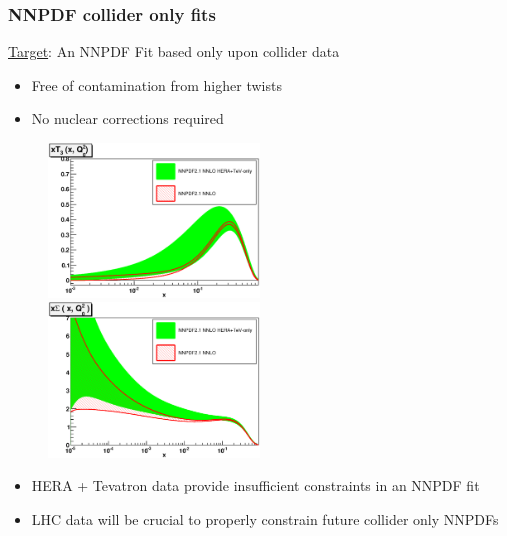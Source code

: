 \documentclass[10pt]{beamer}
\begin{document}
\begin{frame}
\frametitle{ NNPDF collider only fits }

\underline{Target}: An NNPDF Fit based only upon collider data
\begin{itemize}
\item<1-> Free of contamination from higher twists
\item<1-> No nuclear corrections required
\end{itemize}

 \begin{figure}[b!]
    \begin{center}
      \includegraphics[width=0.50\textwidth]{xT3_Q_2_log-nnpdf21nnlo-collider.eps}
      \includegraphics[width=0.50\textwidth]{xSinglet_Q_2_log-nnpdf21nnlo-collider.eps}
    \end{center}
    \vskip-0.5cm
    \label{fig:pdf-jets}
\end{figure}
\begin{itemize}
\item<1->HERA + Tevatron data provide insufficient constraints in an NNPDF fit
\end{itemize}

\begin{itemize}
\item<1-> LHC data will be crucial to properly constrain future collider only NNPDFs
\end{itemize}
\end{frame}
\end{document}
